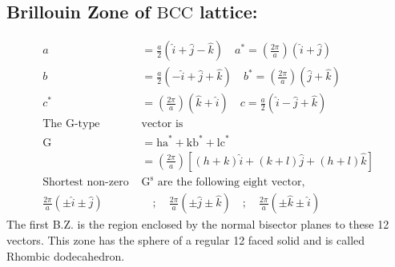 \subsection{Brillouin Zone of $\mathrm{BCC}$ lattice:}
\begin{align*}
a&=\frac{a}{2}(\hat{i}+\hat{j}-\hat{k}) \quad a^{*}=\left(\frac{2 \pi}{a}\right)(\hat{i}+\hat{j})\\
b&=\frac{a}{2}(-\hat{i}+\hat{j}+\hat{k}) \quad b^{*}=\left(\frac{2 \pi}{a}\right)(\hat{j}+\hat{k})\\
c^{*}&=\left(\frac{2 \pi}{a}\right)(\hat{k}+\hat{i}) \quad  c=\frac{a}{2}(\hat{i}-\hat{j}+\hat{k})\\
\text{The G-type }&\text{vector is}\\
\mathrm{G}&=\mathrm{ha}^{*}+\mathrm{kb}^{*}+\mathrm{lc}^{*}\\
&= \left(\frac{2 \pi}{a}\right)[(h+k) \hat{i}+(k+l) \hat{j}+(h+l) \hat{k}]\\
\text{Shortest non-zero  }&\text{$\mathrm{G}^{\mathrm{s}}$ are the following eight vector,}\\
\frac{2 \pi}{a}(\pm \hat{i} \pm \hat{j}) &\quad ;\quad \frac{2 \pi}{a}(\pm \hat{j} \pm \hat{k}) \quad;\quad \frac{2 \pi}{a}(\pm \hat{k} \pm \hat{i})
\end{align*}
The first B.Z. is the region enclosed by the normal bisector planes to these 12 vectors. This zone has the sphere of a regular 12 faced solid and is called Rhombic dodecahedron.

